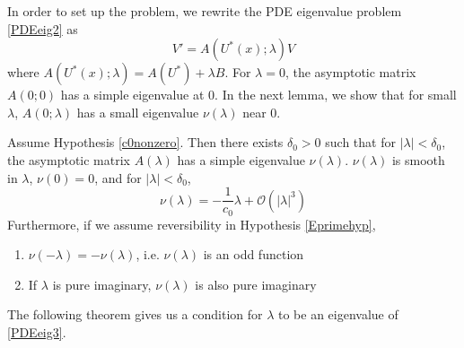 \documentclass[thesis.tex]{subfiles}
\begin{document}
In order to set up the problem, we rewrite the PDE eigenvalue problem \eqref{PDEeig2} as
\begin{equation}\label{PDEeig3}
V' = A(U^*(x); \lambda)V 
\end{equation} 
where $A(U^*(x); \lambda) = A(U^*) + \lambda B$. For $\lambda = 0$, the asymptotic matrix $A(0; 0)$ has a simple eigenvalue at 0. In the next lemma, we show that for small $\lambda$, $A(0; \lambda)$ has a small eigenvalue $\nu(\lambda)$ near 0.

\begin{lemma}\label{nulambdalemma}
Assume Hypothesis \ref{c0nonzero}. Then there exists $\delta_0 > 0$ such that for $|\lambda| < \delta_0$, the asymptotic matrix $A(\lambda)$ has a simple eigenvalue $\nu(\lambda)$. $\nu(\lambda)$ is smooth in $\lambda$, $\nu(0) = 0$, and for $|\lambda| < \delta_0$,
\begin{equation}\label{nulambda}
\nu(\lambda) = -\frac{1}{c_0} \lambda + \mathcal{O}(|\lambda|^3)
\end{equation}
Furthermore, if we assume reversibility in Hypothesis \ref{Eprimehyp},
\begin{enumerate}
\item $\nu(-\lambda) = -\nu(\lambda)$, i.e. $\nu(\lambda)$ is an odd function 
\item If $\lambda$ is pure imaginary, $\nu(\lambda)$ is also pure imaginary
\end{enumerate}
\end{lemma}

The following theorem gives us a condition for $\lambda$ to be an eigenvalue of \eqref{PDEeig3}.
\end{document}

